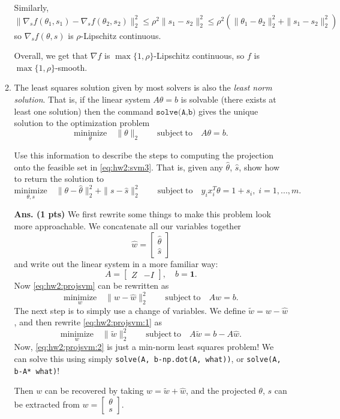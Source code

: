 \documentclass{article}
\newcommand{\minimize}[1]{\underset{#1}{\text{minimize}}}
\newcommand{\mb}{\mathbf}
\newcommand{\subjto}{\mathrm{subject~to}}
\newcommand{\bmat}{\left[\begin{matrix}}
\newcommand{\emat}{\end{matrix}\right]}
\newcommand{\showsolutionpts}[2]{\textbf{Ans. (#1 pts)} \;#2}
\begin{document}
\begin{enumerate}
\begin{enumerate}
{Similarly,
\[
\|\nabla_s f(\theta_1,s_1) - \nabla_s f(\theta_2,s_2) \|_2^2 \leq \rho^2\|s_1-s_2\|_2^2 \leq \rho^2(\|\theta_1-\theta_2\|_2^2 + \|s_1-s_2\|_2^2)
\]
so $\nabla_s f(\theta,s)$ is $\rho$-Lipschitz continuous.

Overall, we get that $\nabla f$ is $\max\{1,\rho\}$-Lipschitz continuous, so $f$ is $\max\{1,\rho\}$-smooth.
}


\item The least squares solution given by most solvers is also the \emph{least norm solution}. That is, if the linear system $A\theta = b$ is solvable (there exists at least one solution) then the command $\texttt{solve(A,b)}$ gives the unique solution to the optimization problem 
\[
\minimize{\theta} \quad \|\theta\|_2 \qquad \subjto \quad A\theta = b.
\]

Use this information to describe the steps to computing the projection onto the feasible set in \eqref{eq:hw2:svm3}. That is, given any $\hat \theta$, $\hat s$, show how to return the solution to
\begin{equation}
\minimize{\theta,s} \quad \|\theta-\hat \theta\|_2^2 + \|s-\hat s\|_2^2 \qquad \subjto \quad y_ix_i^T\theta = 1 + s_i, \;  i = 1,...,m.
\label{eq:hw2:projsvm}
\end{equation}

\showsolutionpts{1}{
We first rewrite some things to make this problem look more approachable. We concatenate all our variables together
\[
\hat w = \bmat \hat \theta\\\hat s\emat
\]
and write out the linear system in a more familiar way:
\[
 A = \bmat Z & -I\emat, \quad b = \mb 1.
\]
Now \eqref{eq:hw2:projsvm} can be rewritten as 
\begin{equation}
\minimize{w} \quad \|w-\hat w\|_2^2 \qquad \subjto \quad Aw=b.
\label{eq:hw2:projsvm:1}
\end{equation}
The next step is to simply use a change of variables. We define $\tilde w = w - \hat w$, and then rewrite \eqref{eq:hw2:projsvm:1} as
\begin{equation}
\minimize{w} \quad \|\tilde w\|_2^2 \qquad \subjto \quad A\tilde w=b -A \hat w.
\label{eq:hw2:projsvm:2}
\end{equation}
Now, \eqref{eq:hw2:projsvm:2} is just a min-norm least squares problem! We can solve this using simply
\texttt{solve(A, b-np.dot(A, what))}, or \texttt{solve(A, b-A* what)}!

Then $w$ can be recovered by taking $w = \tilde w + \hat w$, and the projected $\theta$, $s$ can be extracted from $w = \bmat \theta \\ s\emat$.
}





\end{enumerate}
\end{enumerate}
\end{document}
